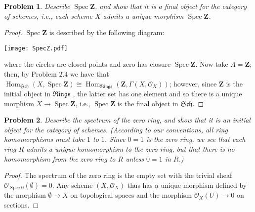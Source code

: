 \documentclass[12pt,letterpaper]{article}
\newtheorem{problem}{Problem}[section]
\theoremstyle{definition}
\theoremstyle{remark}
\numberwithin{equation}{section}
\numberwithin{figure}{problem}
\DeclareMathOperator{\Spec}{Spec}
\DeclareMathOperator{\Hom}{Hom}
\newcommand{\OO}{\mathcal{O}}
\newcommand{\Sch}{\mathfrak{Sch}}
\newcommand{\Rings}{\mathfrak{Rings}}
\begin{document}
\begin{problem}
  Describe $\Spec\mathbf{Z}$, and show that it is a final object for the category of schemes, i.e., each scheme $X$ admits a unique morphism $\Spec\mathbf{Z}$.
\end{problem}
\begin{proof}
  $\Spec\mathbf{Z}$ is described by the following diagram:
  \vspace{1em}
  \begin{center}
    \texttt{[image: SpecZ.pdf]}
  \end{center}
  where the circles are closed points and zero has closure $\Spec\mathbf{Z}$. Now take $A = \mathbf{Z}$; then, by Problem $2.4$ we have that $\Hom_\Sch(X,\Spec\mathbf{Z}) \cong \Hom_\Rings(\mathbf{Z},\Gamma(X,\OO_X))$; however, since $\mathbf{Z}$ is the initial object in $\Rings$ \cite[Prop.~11.3.10]{Art11}, the latter set has one element and so there is a unique morphism $X\to\Spec\mathbf{Z}$, i.e., $\Spec\mathbf{Z}$ is the final object in $\Sch$.
\end{proof}

\begin{problem}
  Describe the spectrum of the zero ring, and show that it is an initial object for the category of schemes. (According to our conventions, all ring homomorphisms must take $1$ to $1$. Since $0=1$ is the zero ring, we see that each ring $R$ admits a unique homomorphism to the zero ring, but that there is no homomorphism from the zero ring to $R$ unless $0 = 1$ in $R$.)
\end{problem}
\begin{proof}
  The spectrum of the zero ring is the empty set with the trivial sheaf $\OO_{\Spec 0}(\emptyset) = 0$. Any scheme $(X,\OO_X)$ thus has a unique morphism defined by the morphism $\emptyset \to X$ on topological spaces and the morphism $\OO_X(U) \to 0$ on sections.
\end{proof}
\end{document}

